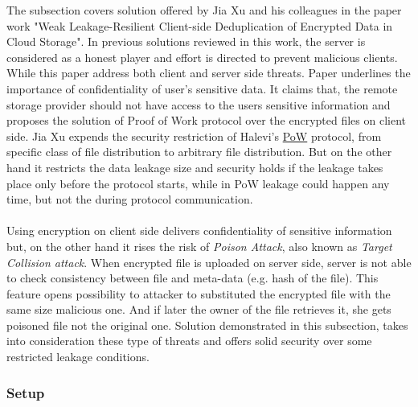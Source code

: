 \documentclass[12pt]{article}
\begin{document}
The subsection covers solution offered by Jia Xu and his colleagues in the paper work "Weak Leakage-Resilient Client-side Deduplication of Encrypted Data in Cloud Storage".\cite{Leakage-Resilient} In previous solutions reviewed in this work, the server is considered as a honest player and effort is directed to prevent malicious clients. While this paper address both client and server side threats. Paper underlines the importance of confidentiality of user's sensitive data. It claims that, the remote storage provider should not have access to the users sensitive information and proposes the solution of Proof of Work protocol over the encrypted files on client side. Jia Xu expends the security restriction of Halevi's \hyperref[sub:Soltuion1]{PoW}  protocol, from specific class of file distribution to arbitrary file distribution. But on the other hand it restricts the data leakage size and security holds if the leakage takes place only before the protocol starts, while in PoW leakage could happen any time, but not the during protocol communication.\\\\
Using encryption on client side delivers confidentiality of sensitive information but, on the other hand it rises the risk of \textit{Poison Attack}, also known as \textit{Target Collision attack}.\cite{PoisonAttac} When encrypted file is uploaded on server side, server is not able to check consistency between file and meta-data (e.g. hash of the file). This feature opens possibility to attacker to substituted the encrypted file with the same size malicious one. And if later the owner of the file retrieves it, she gets poisoned file not the original one. Solution demonstrated in this subsection, takes into consideration these type of threats and  offers solid security over some restricted leakage conditions.


\subsubsection{Setup}
\label{subsub:setup4}
\end{document}
